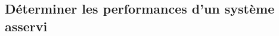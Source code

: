 \subsection{Déterminer les performances d'un système asservi}

\renewcommand{\repExo}{../../ExercicesCompetences/C2_MettreEnOeuvreDemarche/C2_02_DiagrammeBode}

\renewcommand{\td}{509_Divers}
\graphicspath{{\repStyle/png/}{\repExo/\td/images/}}


